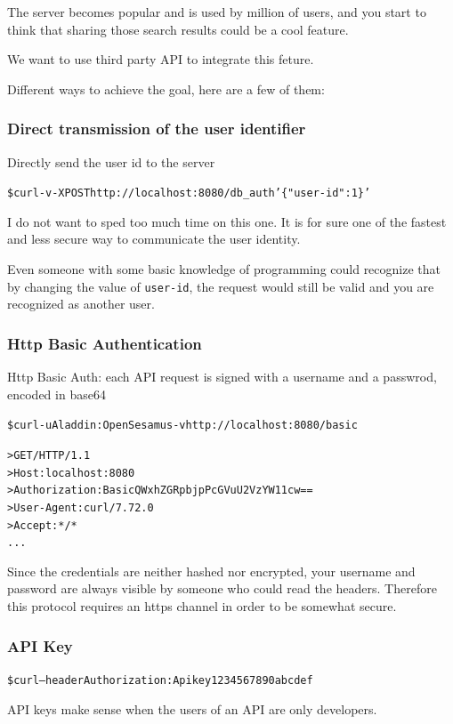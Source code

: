 \documentclass{style}
\begin{document}
The server becomes popular and is used by million of users, and you start to
think that sharing those search results could be a cool feature.

We want to use third party API to integrate this feture.

Different ways to achieve the goal, here are a few of them:
\subsubsection{Direct transmission of the user identifier}
Directly send the user id to the server
\begin{alltt}
    \$ curl -v -X POST http://localhost:8080/db_auth '\{"user-id": 1\}'
\end{alltt}
I do not want to sped too much time on this one. It is for sure one of the
fastest
and less secure way to communicate the user identity.

Even someone with some basic knowledge of programming could recognize that by changing the
value of \texttt{user-id}, the request would still be valid and you are recognized as
another user.

\subsubsection{Http Basic Authentication}
Http Basic Auth: each API request is signed with a username and a passwrod, encoded in base64
\begin{alltt}
    \$ curl -u Aladdin:OpenSesamus -v http://localhost:8080/basic

    > GET / HTTP/1.1
    > Host: localhost:8080
    > Authorization: Basic QWxhZGRpbjpPcGVuU2VzYW11cw==
    > User-Agent: curl/7.72.0
    > Accept: */*
    ...
\end{alltt}
Since the credentials are neither hashed nor encrypted, your username and password are always visible by
someone who could read the headers.
Therefore this protocol requires an https channel in order to be somewhat secure.

\subsubsection{API Key}
\begin{alltt}
    \$ curl --header Authorization: Apikey 1234567890abcdef
\end{alltt}
API keys make sense when the users of an API are only developers.
\end{document}
